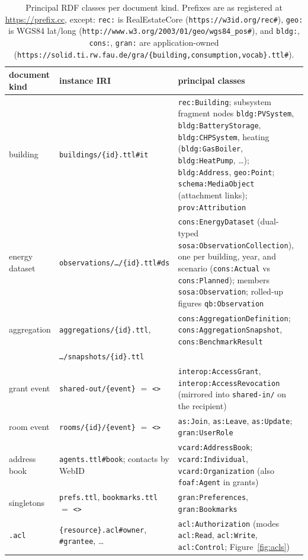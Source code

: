 \documentclass[11pt,a4paper]{article}
\theoremstyle{remark}
\newcommand{\code}[1]{\texttt{#1}}
\begin{document}
\begin{table}[t]
\centering
\small
\setlength{\tabcolsep}{4pt}
\begin{tabular}{@{}llp{6.4cm}@{}}
document kind & instance IRI & principal classes \\
\hline
building & \code{buildings/\{id\}.ttl\#it} & \code{rec:Building}; subsystem
  fragment nodes \code{bldg:PVSystem}, \code{bldg:BatteryStorage},
  \code{bldg:CHPSystem}, heating (\code{bldg:GasBoiler},
  \code{bldg:HeatPump}, \ldots); \code{bldg:Address}, \code{geo:Point};
  \code{schema:MediaObject} (attachment links); \code{prov:Attribution} \\
energy dataset & \code{observations/\ldots/\{id\}.ttl\#ds} &
  \code{cons:EnergyDataset} (dual-typed \code{sosa:ObservationCollection}),
  one per building, year, and scenario (\code{cons:Actual} vs
  \code{cons:Planned}); members \code{sosa:Observation}; rolled-up figures
  \code{qb:Observation} \\
aggregation & \code{aggregations/\{id\}.ttl},
  & \code{cons:AggregationDefinition}; \code{cons:AggregationSnapshot},
  \code{cons:BenchmarkResult} \\
 & \code{\ldots/snapshots/\{id\}.ttl} & \\
grant event & \code{shared-out/\{event\}} $=$ \code{<>} &
  \code{interop:AccessGrant}, \code{interop:AccessRevocation} (mirrored into
  \code{shared-in/} on the recipient) \\
room event & \code{rooms/\{id\}/\{event\}} $=$ \code{<>} & \code{as:Join},
  \code{as:Leave}, \code{as:Update}; \code{gran:UserRole} \\
address book & \code{agents.ttl\#book}; contacts by WebID &
  \code{vcard:AddressBook}; \code{vcard:Individual},
  \code{vcard:Organization} (also \code{foaf:Agent} in grants) \\
singletons & \code{prefs.ttl}, \code{bookmarks.ttl} $=$ \code{<>} &
  \code{gran:Preferences}, \code{gran:Bookmarks} \\
\code{.acl} & \code{\{resource\}.acl\#owner}, \code{\#grantee}, \ldots &
  \code{acl:Authorization} (modes \code{acl:Read}, \code{acl:Write},
  \code{acl:Control}; Figure~\ref{fig:acls}) \\
\end{tabular}
\caption{Principal RDF classes per document kind. Prefixes are as registered
at \url{https://prefix.cc}, except: \code{rec:} is RealEstateCore
(\code{https://w3id.org/rec\#}), \code{geo:} is WGS84 lat/long
(\code{http://www.w3.org/2003/01/geo/wgs84\_pos\#}), and \code{bldg:},
\code{cons:}, \code{gran:} are application-owned
(\code{https://solid.ti.rw.fau.de/gra/\{building,consumption,vocab\}.ttl\#}).}
\label{tab:classes}
\end{table}
\end{document}
